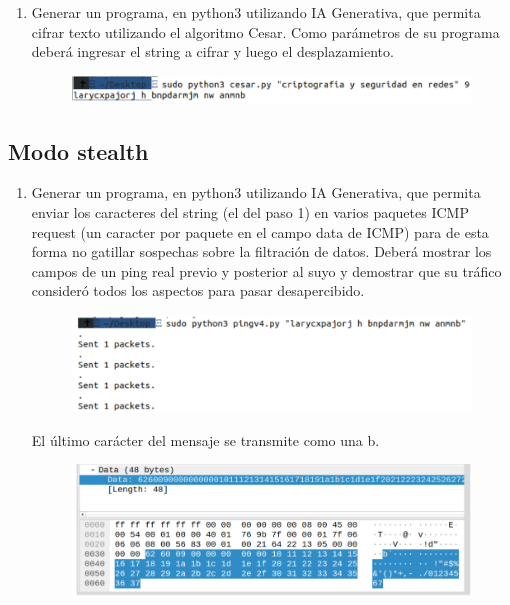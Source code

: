 \documentclass[letter,12pt]{article}
\begin{document}
\begin{enumerate}
\item Generar un programa, en python3 utilizando IA Generativa, que permita cifrar texto utilizando el algoritmo Cesar. Como parámetros de su programa deberá ingresar el string a cifrar y luego el desplazamiento.
\begin{figure}[H]
        \centering
        \includegraphics[width=15cm]{actividades/A1.png}
        \label{fig:a1}
\end{figure}


\end{enumerate}

\subsection{Modo stealth}

\begin{enumerate}
    \item Generar un programa, en python3 utilizando IA Generativa, que permita enviar los caracteres del string (el del paso 1) en varios paquetes ICMP request (un caracter por paquete en el campo data de ICMP) para de esta forma no gatillar sospechas sobre la filtración de datos.
Deberá mostrar los campos de un ping real previo y posterior al suyo y demostrar que su tráfico consideró todos los aspectos para pasar desapercibido.
    \begin{figure}[H]
        \centering
        \includegraphics[width=15cm]{actividades/A2.1.png}
        \label{fig:a2-1}
    \end{figure}
    El último carácter del mensaje se transmite como una b.
    \begin{figure}[H]
            \centering
            \includegraphics[width=15cm]{actividades/A2.2.png}
            \label{fig:a2-2}
        \end{figure}
\end{enumerate}
\end{document}
